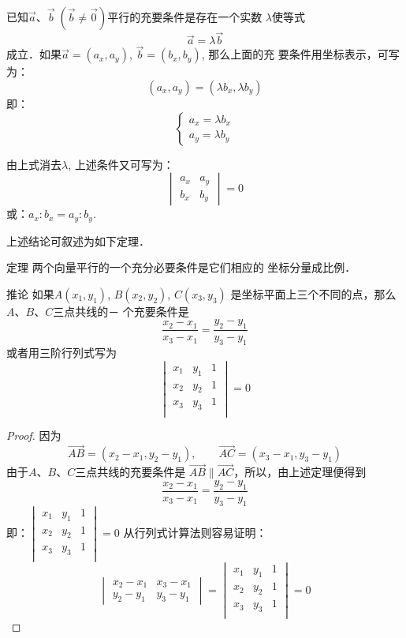 已知$\vec{a}$、$\vec{b}\; (\vec{b}\ne \vec{0})$平行的充要条件是存在一个实数
$\lambda$使等式
\[\vec{a}=\lambda\vec{b}\]
成立．如果$\vec{a}=(a_x,a_y)$, $\vec{b}=(b_x,b_y)$, 
那么上面的充
要条件用坐标表示，可写为：
\[(a_x,a_y)=(\lambda b_x,\lambda b_y)\]
即：
\[\begin{cases}
    a_x=\lambda b_x\\
a_y=\lambda b_y
\end{cases}\]

由上式消去$\lambda$, 上述条件又可写为：
\[\begin{vmatrix}
    a_x& a_y\\b_x&b_y
\end{vmatrix}=0\]
或：$a_x:b_x=a_y:b_y$.

上述结论可叙述为如下定理．

\begin{blk}
    {定理} 两个向量平行的一个充分必要条件是它们相应的
坐标分量成比例．
\end{blk}

\begin{blk}
{推论} 如果$A(x_1,y_1)$, $B(x_2,y_2)$, $C(x_3,y_3)$
是坐标平面上三个不同的点，那么$A$、$B$、$C$三点共线的－
个充要条件是
\[\frac{x_2-x_1}{x_3-x_1}=\frac{y_2-y_1}{y_3-y_1}\]
或者用三阶行列式写为
\[\begin{vmatrix}
    x_1&y_1&1\\
    x_2&y_2&1\\
    x_3&y_3&1\\
\end{vmatrix}=0\]
\end{blk}

\begin{proof}
    因为
\[\Vec{AB}=(x_2-x_1,y_2-y_1),\qquad \Vec{AC}=(x_3-x_1,y_3-y_1)\]
由于$A$、$B$、$C$三点共线的充要条件是
$\Vec{AB}\parallel \Vec{AC}$，所以，由上述定理便得到
\[\frac{x_2-x_1}{x_3-x_1}=\frac{y_2-y_1}{y_3-y_1}\]
即：$\begin{vmatrix}
    x_1&y_1&1\\
    x_2&y_2&1\\
    x_3&y_3&1\\
\end{vmatrix}=0$
从行列式计算法则容易证明：
\[\begin{vmatrix}
    x_2-x_1&x_3-x_1\\
    y_2-y_1&y_3-y_1
\end{vmatrix}=\begin{vmatrix}
    x_1&y_1&1\\
    x_2&y_2&1\\
    x_3&y_3&1\\
\end{vmatrix}=0\]
\end{proof}

